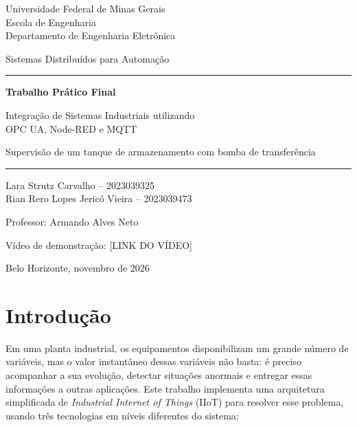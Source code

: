 \documentclass[11pt,a4paper]{article}
\newcommand{\alunoA}{Lara Strutz Carvalho -- 2023039325}
\newcommand{\alunoB}{Rian Rero Lopes Jericó Vieira -- 2023039473}
\newcommand{\linkvideo}{[LINK DO VÍDEO]}
\begin{document}
\begin{titlepage}
  \centering
  {\large Universidade Federal de Minas Gerais\\
  Escola de Engenharia\\
  Departamento de Engenharia Eletrônica\par}
  \vspace{0.6cm}
  {\large Sistemas Distribuídos para Automação\par}
  \vfill
  {\color{azul}\rule{\linewidth}{1pt}\par}
  \vspace{0.4cm}
  {\LARGE\bfseries Trabalho Prático Final\par}
  \vspace{0.3cm}
  {\Large Integração de Sistemas Industriais utilizando\\ OPC UA, Node-RED e MQTT\par}
  \vspace{0.3cm}
  {\large Supervisão de um tanque de armazenamento com bomba de transferência\par}
  \vspace{0.4cm}
  {\color{azul}\rule{\linewidth}{1pt}\par}
  \vfill
  {\large \alunoA\\ \alunoB\par}
  \vspace{0.8cm}
  {\large Professor: Armando Alves Neto\par}
  \vspace{0.4cm}
  {Vídeo de demonstração: \linkvideo\par}
  \vfill
  {\large Belo Horizonte, novembro de 2026\par}
\end{titlepage}

\tableofcontents
\newpage

\section{Introdução}

Em uma planta industrial, os equipamentos disponibilizam um grande número de
variáveis, mas o valor instantâneo dessas variáveis não basta: é preciso
acompanhar a sua evolução, detectar situações anormais e entregar essas
informações a outras aplicações. Este trabalho implementa uma arquitetura
simplificada de \emph{Industrial Internet of Things} (IIoT) para resolver esse
problema, usando três tecnologias em níveis diferentes do sistema:
\end{document}
